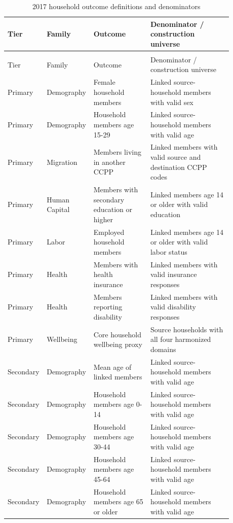 \begingroup\fontsize{9.25}{11.4}\selectfont
\setlength{\tabcolsep}{3pt}\renewcommand{\arraystretch}{1.18}
\begin{longtable}{@{}>{\raggedright\arraybackslash}p{0.10\linewidth}p{0.17\linewidth}p{0.25\linewidth}p{0.36\linewidth}@{}}
\caption{2017 household outcome definitions and denominators}\label{tab:pub_A19} \\
\toprule Tier & Family & Outcome & Denominator / construction universe \\ \midrule\endfirsthead
\multicolumn{4}{c}{\tablename\ \thetable{} -- continued} \\
\toprule Tier & Family & Outcome & Denominator / construction universe \\ \midrule\endhead
Primary & Demography & Female household members & Linked source-household members with valid sex \\
Primary & Demography & Household members age 15-29 & Linked source-household members with valid age \\
Primary & Migration & Members living in another CCPP & Linked members with valid source and destination CCPP codes \\
Primary & Human Capital & Members with secondary education or higher & Linked members age 14 or older with valid education \\
Primary & Labor & Employed household members & Linked members age 14 or older with valid labor status \\
Primary & Health & Members with health insurance & Linked members with valid insurance responses \\
Primary & Health & Members reporting disability & Linked members with valid disability responses \\
Primary & Wellbeing & Core household wellbeing proxy & Source households with all four harmonized domains \\
Secondary & Demography & Mean age of linked members & Linked source-household members with valid age \\
Secondary & Demography & Household members age 0-14 & Linked source-household members with valid age \\
Secondary & Demography & Household members age 30-44 & Linked source-household members with valid age \\
Secondary & Demography & Household members age 45-64 & Linked source-household members with valid age \\
Secondary & Demography & Household members age 65 or older & Linked source-household members with valid age \\

\end{longtable}
